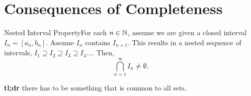 
\renewcommand{\theenumi}{\arabic{enumi}}
\renewcommand{\labelenumi}{\theenumi.}
\section{Consequences of Completeness}

\begin{ntheorem}
    {Nested Interval Property}For each \(n \in \mathbb{N}\), assume we are given a closed interval \(I_n = [a_n, b_n]\). Assume \(I_n\) contains \(I_{n+1}\). This results in a nested sequence of intervals, \(I_1 \supseteq I_2 \supseteq I_3 \supseteq I_4\dots\). Then, 
    \[
        \bigcap_{n=1}^\infty I_{n} \ne \emptyset.
    \]
\end{ntheorem}

\textbf{tl;dr} there has to be something that is common to all sets.

